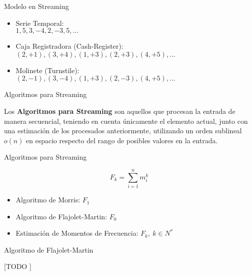 \documentclass[12pt]{beamer}
\begin{document}
    \begin{frame}[fragile]{Modelo en Streaming}

    \begin{itemize}
      \item Serie Temporal:\\
        $1, 5, 3, -4, 2, -3, 5,...$
      \item Caja Registradora (Cash-Register): \\
        $(2, +1), (3, +4), (1, +3), (2, +3), (4, +5),...$
      \item Molinete (Turnstile): \\
        $(2, -1), (3, -4), (1, +3), (2, -3), (4, +5),...$
    \end{itemize}

  \end{frame}

    \begin{frame}[fragile]{Algoritmos para Streaming}

      Los \textbf{Algoritmos para Streaming} son aquellos que procesan la entrada de manera secuencial, teniendo en cuenta únicamente el elemento actual, junto con una estimación de los procesados anteriormente, utilizando un orden sublineal $o(n)$ en espacio respecto del rango de posibles valores en la entrada.

    \end{frame}

    \begin{frame}[fragile]{Algoritmos para Streaming}

      \begin{equation}
        F_k = \sum_{i=1}^n m_i^k
      \end{equation}

      \begin{itemize}
        \item Algoritmo de Morris: $F_1$
        \item Algoritmo de Flajolet-Martin: $F_0$
        \item Estimación de Momentos de Frecuencia: $F_k, \ k \in N^*$
      \end{itemize}

    \end{frame}

    \begin{frame}[fragile]{Algoritmo de Flajolet-Martin}

      [TODO ]

    \end{frame}
\end{document}
